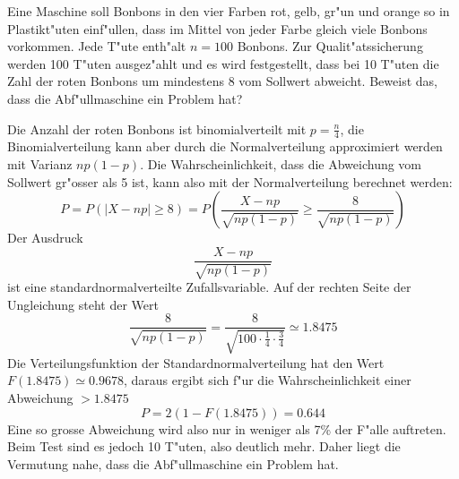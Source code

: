 Eine Maschine soll Bonbons in den vier Farben rot, gelb, gr"un
und orange so in
Plastikt"uten einf"ullen, dass im Mittel von jeder Farbe gleich
viele Bonbons vorkommen. Jede T"ute enth"alt $n=100$ Bonbons.
Zur Qualit"atssicherung werden 100 T"uten ausgez"ahlt und
es wird festgestellt, dass bei 10 T"uten die Zahl der roten
Bonbons um mindestens 8 vom Sollwert abweicht. Beweist das,
dass die Abf"ullmaschine ein Problem hat?

\begin{loesung}
Die Anzahl der roten Bonbons ist binomialverteilt mit $p=\frac{n}4$,
die Binomialverteilung
kann aber durch die Normalverteilung approximiert werden mit
Varianz $np(1-p)$. Die Wahrscheinlichkeit, dass die Abweichung vom
Sollwert gr"osser als 5 ist, kann also mit der Normalverteilung
berechnet werden:
\[
P = P\left(\left|X-np\right|\ge 8\right)
=P\left(
\frac{X-np}{\sqrt{np(1-p)}}\ge \frac{8}{\sqrt{np(1-p)}}
\right)
\]
Der Ausdruck
\[
\frac{X-np}{\sqrt{np(1-p)}}
\]
ist eine standardnormalverteilte Zufallsvariable. Auf der
rechten Seite der Ungleichung steht der Wert
\[
\frac{8}{\sqrt{np(1-p)}}
=\frac{8}{\sqrt{100\cdot\frac14\cdot\frac34}}\simeq 1.8475
\]
Die Verteilungsfunktion der Standardnormalverteilung hat den
Wert $F(1.8475)\simeq0.9678$, daraus ergibt sich f"ur die
Wahrscheinlichkeit einer Abweichung $>1.8475$
\[
P=2(1-F(1.8475))=0.644
\]
Eine so grosse Abweichung wird also nur in weniger als 7\%
der F"alle auftreten. Beim Test sind es jedoch 10 T"uten,
also deutlich mehr. Daher liegt die Vermutung nahe, dass
die Abf"ullmaschine ein Problem hat.
\end{loesung}

